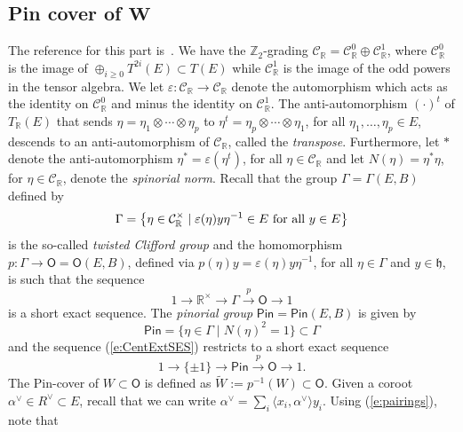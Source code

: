 \documentclass[10pt,a4paper]{amsart}
\numberwithin{equation}{section}
\newcommand{\fh}{\mathfrak{h}}
\newcommand{\bbr}{\mathbb{R}}
\newcommand{\lpi}{\langle}
\newcommand{\rpi}{\rangle}
\begin{document}
\subsection[Pin cover of W]{Pin cover of $\boldsymbol{W}$} \label{s:PinCover}
The reference for this part is~\cite{M76}. We have the $\mathbb{Z}_2$-grading $\mathcal{C}_\bbr = \mathcal{C}_\bbr^0\oplus\mathcal{C}_\bbr^1$, where $\mathcal{C}_\bbr^0$ is the image of $\oplus_{i\geq 0} T^{2i}(E)\subset T(E)$ while $\mathcal{C}_\bbr^1$ is the image of the odd powers in the tensor algebra. We let $\varepsilon\colon \mathcal{C}_\bbr\to\mathcal{C}_\bbr$ denote the automorphism which acts as the identity on $\mathcal{C}_\bbr^0$ and minus the identity on $\mathcal{C}_\bbr^1$. The anti-automorphism ${(\cdot)}^t$ of $T_\bbr(E)$ that sends $\eta = \eta_1\otimes\cdots\otimes\eta_p$ to $\eta^t = \eta_p\otimes\cdots\otimes\eta_1$, for all $\eta_1,\dots,\eta_p\in E$, descends to an anti-automorphism of $\mathcal{C}_\bbr$, called the {\it transpose}. Furthermore, let $\ast$ denote the anti-automorphism $\eta^* = \varepsilon(\eta^t)$, for all $\eta\in\mathcal{C}_\bbr$ and let $N(\eta) = \eta^*\eta$, for $\eta \in \mathcal{C}_\bbr$, denote the {\it spinorial norm}. Recall that the group $\Gamma = \Gamma(E,B)$ defined by
\[
\Gamma = \big\{\eta\in\mathcal{C}_\bbr^\times\mid \varepsilon(\eta)y\eta^{-1}\in E \textup{ for all } y\in E\big\}
\]
is the so-called {\it twisted Clifford group} and the homomorphism $p\colon \Gamma\to \mathsf{O}=\mathsf{O}(E,B)$, defined via $p(\eta)y = \varepsilon(\eta)y\eta^{-1}$, for all $\eta\in\Gamma$ and $y\in\fh$, is such that the sequence
\begin{equation}\label{e:CentExtSES}
1 \longrightarrow \bbr^\times \longrightarrow \Gamma \stackrel{p}{\longrightarrow} \mathsf{O} \longrightarrow 1
\end{equation}
is a short exact sequence. The {\it pinorial group} $\mathsf{Pin} = \mathsf{Pin}(E,B)$ is given by
\[
\mathsf{Pin} = \big\{\eta\in\Gamma \mid N(\eta)^2 = 1 \big\} \subset \Gamma
\]
and the sequence (\ref{e:CentExtSES}) restricts to a short exact sequence
\begin{equation}\label{e:WSES}
1 \longrightarrow \{\pm 1\} \longrightarrow \mathsf{Pin} \stackrel{p}{\longrightarrow} \mathsf{O} \longrightarrow 1.
\end{equation}
The Pin-cover of $W\subset\mathsf{O}$ is defined as $\tilde W := p^{-1}(W)\subset \mathsf{O}$. Given a coroot $\alpha^\vee\in R^\vee\subset E$, recall that we can write $\alpha^\vee = \sum_i\lpi x_i,\alpha^\vee \rpi y_i$. Using (\ref{e:pairings}), note that
\end{document}
